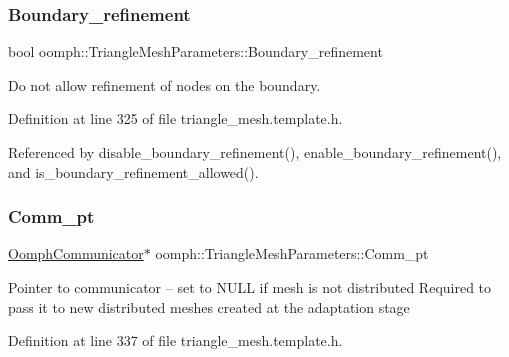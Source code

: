 \mbox{\label{classoomph_1_1TriangleMeshParameters_a0a97e7b7a890c2584206eb6b584ae5f3}} 
\subsubsection{\texorpdfstring{Boundary\+\_\+refinement}{Boundary\_refinement}}
{\footnotesize\ttfamily bool oomph\+::\+Triangle\+Mesh\+Parameters\+::\+Boundary\+\_\+refinement\hspace{0.3cm}{\ttfamily [protected]}}



Do not allow refinement of nodes on the boundary. 



Definition at line 325 of file triangle\+\_\+mesh.\+template.\+h.



Referenced by disable\+\_\+boundary\+\_\+refinement(), enable\+\_\+boundary\+\_\+refinement(), and is\+\_\+boundary\+\_\+refinement\+\_\+allowed().

\mbox{\label{classoomph_1_1TriangleMeshParameters_acf0912db2ab6a5f3f379c1839356ebd6}} 
\subsubsection{\texorpdfstring{Comm\+\_\+pt}{Comm\_pt}}
{\footnotesize\ttfamily \hyperlink{classoomph_1_1OomphCommunicator}{Oomph\+Communicator}$\ast$ oomph\+::\+Triangle\+Mesh\+Parameters\+::\+Comm\+\_\+pt\hspace{0.3cm}{\ttfamily [protected]}}

Pointer to communicator -- set to N\+U\+LL if mesh is not distributed Required to pass it to new distributed meshes created at the adaptation stage 

Definition at line 337 of file triangle\+\_\+mesh.\+template.\+h.



